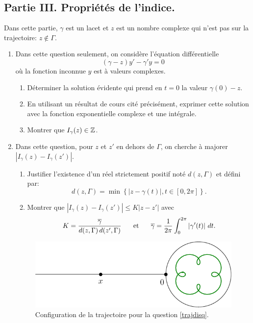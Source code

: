 \subsection*{Partie III. Propriétés de l'indice.}
Dans cette partie, $\gamma$ est un lacet et $z$ est un nombre complexe qui n'est pas sur la trajectoire: $z\notin \Gamma$.
\begin{enumerate}
 \item Dans cette question seulement, on considère l'équation différentielle
\begin{equation*}
 (\gamma - z) y' - \gamma' y = 0
\end{equation*}
où la fonction inconnue $y$ est à valeurs complexes.
\begin{enumerate}
 \item Déterminer la solution évidente qui prend en $t=0$ la valeur $\gamma(0) - z$.
 \item En utilisant un résultat de cours cité précisément, exprimer cette solution avec la fonction exponentielle complexe et une intégrale.
 \item Montrer que $I_\gamma(z) \in \mathbb{Z}$.
\end{enumerate}

 \item Dans cette question, pour $z$ et $z'$ en dehors de $\Gamma$, on cherche à majorer $\left| I_\gamma(z) - I_\gamma(z')\right|$.
 \begin{enumerate}
  \item Justifier l'existence d'un réel strictement positif noté $d(z,\Gamma)$ et défini par:
\[
 d(z,\Gamma) = \min \left\lbrace \left| z - \gamma(t) \right|, t\in [0, 2\pi ] \right\rbrace .
\]
  \item Montrer que $\left| I_\gamma(z) - I_\gamma(z')\right| \leq K \left| z - z' \right|$ avec 
\[
 K = \frac{\overline{\gamma}}{d(z,\Gamma)\,d(z',\Gamma)} \hspace{0.5cm} \text{ et } \hspace{0.5cm} \overline{\gamma} = \frac{1}{2\pi} \int_{0}^{2\pi}\left|\gamma'(t)\right|\, dt.
\] 

 \end{enumerate}
\begin{figure}[h]
 \centering
 \includegraphics{./Erouche_3.pdf}
 \caption{Configuration de la trajectoire pour la question \ref{trajdisq}.}
 \label{fig:rouche_3}
\end{figure}


\end{enumerate}
